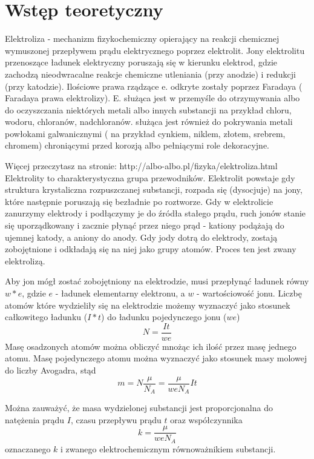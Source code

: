 \documentclass[a4paper,10pt,twoside]{article}
\begin{document}
\section{Wstęp teoretyczny}

Elektroliza - mechanizm fizykochemiczny opierający na reakcji chemicznej wymuszonej przepływem prądu elektrycznego poprzez elektrolit. Jony elektrolitu przenoszące ładunek elektryczny poruszają się w kierunku elektrod, gdzie zachodzą nieodwracalne reakcje chemiczne utleniania (przy anodzie) i redukcji (przy katodzie). Ilościowe prawa rządzące e. odkryte zostały poprzez Faradaya ( Faradaya prawa elektrolizy). E. służąca jest w przemyśle do otrzymywania albo do oczyszczania niektórych metali albo innych substancji na przykład chloru, wodoru, chloranów, nadchloranów. służąca jest również do pokrywania metali powłokami galwanicznymi ( na przykład cynkiem, niklem, złotem, srebrem, chromem) chroniącymi przed korozją albo pełniącymi role dekoracyjne. 

Więcej przeczytasz na stronie: http://albo-albo.pl/fizyka/elektroliza.html
Elektrolity to charakterystyczna grupa przewodników. Elektrolit powstaje gdy struktura krystaliczna rozpuszczanej substancji, rozpada się (dysocjuje)
na jony, które następnie poruszają się bezładnie po roztworze. Gdy w elektrolicie zanurzymy elektrody i podłączymy je do źródła stałego prądu,
ruch jonów stanie się uporządkowany i zacznie płynąć przez niego prąd - kationy podążają do ujemnej katody, a aniony do anody.
Gdy jody dotrą do elektrody, zostają zobojętnione i odkładają się na niej jako grupy atomów. Proces ten jest zwany elektrolizą.

Aby jon mógł zostać zobojętniony na elektrodzie, musi przepłynąć ładunek równy $w*e$, gdzie $e$ - ładunek elementarny elektronu, a $w$ - wartościowość jonu.
Liczbę atomów które wydzieliły się na elektrodzie możemy wyznaczyć jako stosunek całkowitego ładunku ($I*t$) do ładunku pojedynczego jonu ($we$)
\begin{equation}
N=\frac{It}{we}
\end{equation}
Masę osadzonych atomów można obliczyć mnożąc ich ilość przez masę jednego atomu. Masę pojedynczego atomu można wyznaczyć jako stosunek masy molowej do
liczby Avogadra, stąd
\begin{equation}
\label{eq:masa}
m=N\frac{\mu}{N_A}=\frac{\mu}{weN_A}It
\end{equation}

Można zauważyć, że masa wydzielonej substancji jest proporcjonalna do natężenia prądu $I$, czasu przepływu prądu $t$ oraz współczynnika 
\begin{equation}
\label{eq:k}
k=\frac{\mu}{weN_A}
\end{equation}
oznaczanego $k$ i zwanego elektrochemicznym równoważnikiem substancji.
\end{document}
